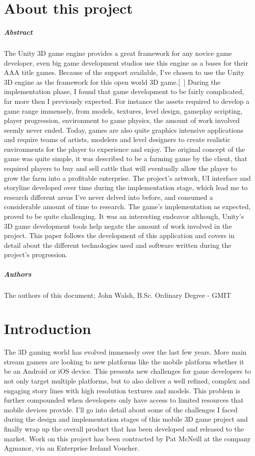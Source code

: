 \chapter*{About this project}
\paragraph{Abstract}
The Unity 3D game engine provides a great framework for any novice game developer, even big game development studios use this engine as a bases for their AAA title games. Because of the support available, I've chosen to use the Unity 3D engine as the framework for this open world 3D game.[~\cite{Unity3D}] During the implementation phase, I found that game development to be fairly complicated, far more then I previously expected. For instance the assets required to develop a game range immensely, from models, textures, level design, gameplay scripting, player progression, environment to game physics, the amount of work involved seemly never ended. Today, games are also quite graphics intensive applications and require teams of artists, modelers and level designers to create realistic environments for the player to experience and enjoy. 
The original concept of the game was quite simple, it was described to be a farming game by the client, that required players to buy and sell cattle that will eventually allow the player to grow the farm into a profitable enterprise. The project's artwork, UI interface and storyline developed over time during the implementation stage, which lead me to research different areas I've never delved into before, and consumed a considerable amount of time to research. The game's implementation as expected, proved to be quite challenging. It was an interesting endeavor although, Unity's 3D game development tools help negate the amount of work involved in the project. This paper follows the development of this application and covers in detail about the different technologies used and software written during the project's progression.
\paragraph{Authors}
The authors of this document; John Walsh, B.Sc. Ordinary Degree - GMIT
\chapter{Introduction}
The 3D gaming world has evolved immensely over the last few years. More main stream gamers are looking to new platforms like the mobile platform whether it be an Android or iOS device. This presents new challenges for game developers to not only target multiple platforms, but to also deliver a well refined, complex and engaging story lines with high resolution textures and models. This problem is further compounded when developers only have access to limited resources that mobile devices provide. I'll go into detail about some of the challenges I faced during the design and implementation stages of this mobile 3D game project and finally wrap up the overall product that has been developed and released to the market. Work on this project has been contracted by Pat McNeill at the company Agmanor, via an Enterprise Ireland Voucher.
